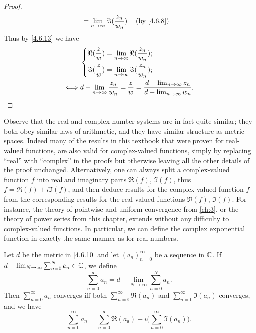 \begin{proof}
\begin{align*}
                      & = \lim_{n \to \infty} \Im(\dfrac{z_n}{w_n}).                                                                       &  & \text{(by \cref{4.6.8})}
  \end{align*}
  Thus by \cref{4.6.13} we have
  \begin{align*}
         & \begin{dcases}
             \Re(\dfrac{z}{w}) = \lim_{n \to \infty} \Re(\dfrac{z_n}{w_n}); \\
             \Im(\dfrac{z}{w}) = \lim_{n \to \infty} \Im(\dfrac{z_n}{w_n});
           \end{dcases}                                                              \\
    \iff & d - \lim_{n \to \infty} \dfrac{z_n}{w_n} = \dfrac{z}{w} = \dfrac{d - \lim_{n \to \infty} z_n}{d - \lim_{n \to \infty} w_n}.
  \end{align*}
\end{proof}

\begin{note}
  Observe that the real and complex number systems are in fact quite similar;
  they both obey similar laws of arithmetic, and they have similar structure as metric spaces.
  Indeed many of the results in this textbook that were proven for real-valued functions, are also valid for complex-valued functions, simply by replacing ``real'' with ``complex'' in the proofs but otherwise leaving all the other details of the proof unchanged.
  Alternatively, one can always split a complex-valued function \(f\) into real and imaginary parts \(\Re(f)\), \(\Im(f)\), thus \(f = \Re(f) + i \Im(f)\), and then deduce results for the complex-valued function \(f\) from the corresponding results for the real-valued functions \(\Re(f)\), \(\Im(f)\).
  For instance, the theory of pointwise and uniform convergence from \cref{ch:3}, or the theory of power series from this chapter, extends without any difficulty to complex-valued functions.
  In particular, we can define the complex exponential function in exactly the same manner as for real numbers.
\end{note}

\begin{ac}\label{ac:4.6.6}
  Let \(d\) be the metric in \cref{4.6.10} and let \((a_n)_{n = 0}^\infty\) be a sequence in \(\mathbb{C}\).
  If \(d - \lim_{N \to \infty} \sum_{n = 0}^N a_n \in \mathbb{C}\), we define
  \[
    \sum_{n = 0}^\infty a_n = d - \lim_{N \to \infty} \sum_{n = 0}^N a_n.
  \]
  Then \(\sum_{n = 0}^\infty a_n\) converges iff both \(\sum_{n = 0}^\infty \Re(a_n)\) and \(\sum_{n = 0}^\infty \Im(a_n)\) converges, and we have
  \[
    \sum_{n = 0}^\infty a_n = \sum_{n = 0}^\infty \Re(a_n) + i \bigg(\sum_{n = 0}^\infty \Im(a_n)\bigg).
  \]
\end{ac}

